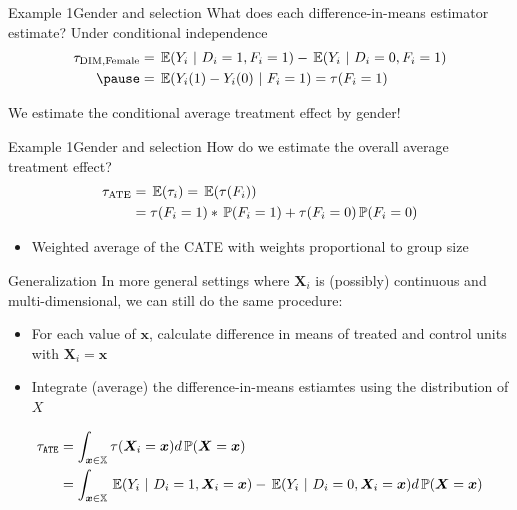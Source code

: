 \documentclass[aspectratio=169,t,11pt,table]{beamer}
\begin{document}
\begin{frame}{Example 1}{Gender and selection}
  What does each difference-in-means estimator estimate? Under conditional independence
  \begin{align*}
    \tau_{\text{DIM},\text{Female}} 
    &= \expec{Y_{i}}{D_i = 1, F_i = 1} - \expec{Y_{i}}{D_i = 0, F_i = 1}  \\ \pause
    &= \expec{Y_{i}(1) - Y_{i}(0)}{F_i = 1} = \tau(F_i = 1)
  \end{align*}

  \bigskip 
  We estimate the conditional average treatment effect by gender!
\end{frame}

\begin{frame}{Example 1}{Gender and selection}
  How do we estimate the overall average treatment effect? 
  \begin{align*}
    \tau_{\text{ATE}} &= \expec{\tau_i} = \expec{\tau(F_i)} \\
    &= \tau(F_i = 1) * \prob{F_i = 1} + \tau(F_i = 0) \prob{F_i = 0}
  \end{align*}
  \begin{itemize}
    \item Weighted average of the CATE with weights proportional to group size
  \end{itemize}
\end{frame}

\begin{frame}{Generalization}
  In more general settings where $\bm{X}_i$ is (possibly) continuous and multi-dimensional, we can still do the same procedure:
  \begin{itemize}
    \item For each value of $\bm{x}$, calculate difference in means of treated and control units with $\bm{X}_i = \bm{x}$
    
    \item Integrate (average) the difference-in-means estiamtes using the distribution of $X$ 
  \end{itemize}

  \pause
  \vspace*{-\medskipamount}
  \begin{align*}
    \tau_{\texttt{ATE}} &= 
    \int_{\bm{x} \in \mathbb{X}} \tau(\bm{X}_i = \bm{x}) d\prob{\bm{X} = \bm{x}} \\ 
    &= \int_{\bm{x} \in \mathbb{X}} \expec{Y_i}{D_i = 1, \bm{X}_i = \bm{x}} - \expec{Y_i}{D_i = 0, \bm{X}_i = \bm{x}} d\prob{\bm{X} = \bm{x}}
  \end{align*}
\end{frame}
\end{document}
